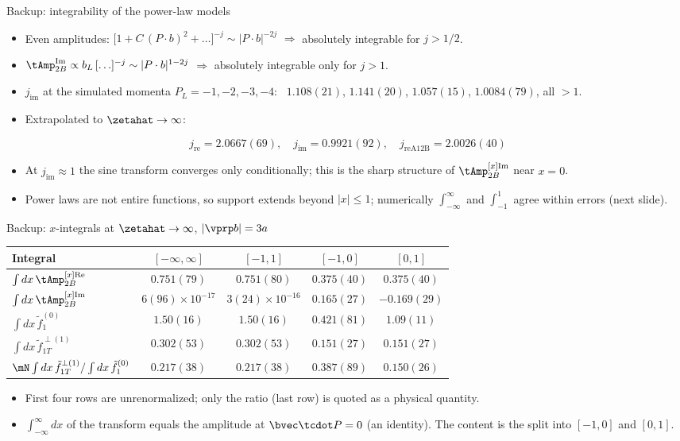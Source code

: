 \begin{frame}{Backup: integrability of the power-law models}
  \begin{itemize}
    \item Even amplitudes: $\big[1+C\,(P\cdot b)^2+\ldots\big]^{-j}\sim|P\cdot b|^{-2j}$ $\Rightarrow$ absolutely integrable for $j>1/2$.
    \item $\tAmp_{2B}^{\text{Im}}\propto b_L\,[\ldots]^{-j}\sim|P\cdot b|^{1-2j}$ $\Rightarrow$ absolutely integrable only for $j>1$.
    \item $j_{\text{im}}$ at the simulated momenta $P_L=-1,-2,-3,-4$: \ $1.108(21)$, $1.141(20)$, $1.057(15)$, $1.0084(79)$, all $>1$.
    \item Extrapolated to $\zetahat\to\infty$:
  \end{itemize}
  \[ j_{\text{re}} = 2.0667(69), \quad j_{\text{im}} = 0.9921(92), \quad j_{\text{reA12B}} = 2.0026(40) \]
  \begin{itemize}
    \item At $j_{\text{im}}\approx1$ the sine transform converges only conditionally; this is the sharp structure of $\tAmp_{2B}^{[x]\text{Im}}$ near $x=0$.
    \item Power laws are not entire functions, so support extends beyond $|x|\le1$; numerically $\int_{-\infty}^{\infty}$ and $\int_{-1}^{1}$ agree within errors (next slide).
  \end{itemize}
\end{frame}

\begin{frame}{Backup: $x$-integrals at $\zetahat\to\infty$, $|\vprp b|=3a$}
  \centering
  \renewcommand{\arraystretch}{1.5}
  {\small
  \begin{tabular}{lcccc}
    \toprule
    Integral & $[-\infty, \infty]$ & $[-1, 1]$ & $[-1, 0]$ & $[0, 1]$ \\
    \midrule
    $\int dx\, \tAmp^{[x]\text{Re}}_{2B}$ & $0.751(79)$ & $0.751(80)$ & $0.375(40)$ & $0.375(40)$ \\
    $\int dx\, \tAmp^{[x]\text{Im}}_{2B}$ & $6(96)\times10^{-17}$ & $3(24)\times10^{-16}$ & $0.165(27)$ & $-0.169(29)$ \\
    $\int dx\, \tilde{f}_1^{(0)}$ & $1.50(16)$ & $1.50(16)$ & $0.421(81)$ & $1.09(11)$  \\
    $\int dx\, \tilde{f}_{1T}^{\perp(1)}$ & $0.302(53)$ & $0.302(53)$ & $0.151(27)$ & $0.151(27)$ \\
    $\mN \int dx\, \tilde{f}_{1T}^{\perp(1)} / \int dx\, \tilde{f}_1^{(0)}$ & $0.217(38)$ & $0.217(38)$ & $0.387(89)$ & $0.150(26)$ \\
    \bottomrule
  \end{tabular}}
  \raggedright
  \begin{itemize}
    \item First four rows are unrenormalized; only the ratio (last row) is quoted as a physical quantity.
    \item $\int_{-\infty}^{\infty}dx$ of the transform equals the amplitude at $\bvec\tcdot P=0$ (an identity). The content is the split into $[-1,0]$ and $[0,1]$.
  \end{itemize}
\end{frame}

